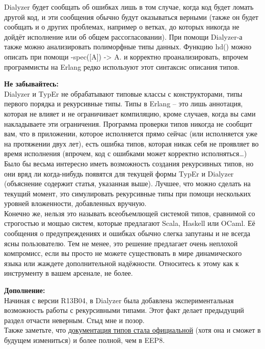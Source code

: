 \documentclass[a4paper,12pt]{report}
\newcommand{\ops}{\colorbox{lgreen}}
\begin{document}
Dialyzer будет сообщать об ошибках лишь в том случае, когда код будет ломать другой код, и эти сообщения обычно будут оказываться верными (также он будет сообщать и о других проблемах, например о ветках, до которых никогда не дойдёт исполнение или об общем рассогласовании). При помощи Dialyzer\--а также можно анализировать полиморфные типы данных. Функцию \ops{hd()} можно описать при помощи \ops{-spec([A]) -> A.} и корректно проанализировать, впрочем программисты на Erlang редко используют этот синтаксис описания типов.\\
\colorbox{lorange}
{
    \begin{minipage}{\linewidth}
        \textbf{Не забывайтесь:}\\
Dialyzer и TypEr не обрабатывают типовые классы с конструкторами, типы первого порядка и рекурсивные типы. Типы в Erlang \--- это лишь аннотация, которая не влияет и не ограничивает компиляцию, кроме случаев, когда вы сами накладываете эти ограничения. Программа проверки типов никогда не сообщит вам, что в приложении, которое исполняется прямо сейчас (или исполняется уже на протяжении двух лет), есть ошибка типов, которая никак себя не проявляет во время исполнения (впрочем, код с ошибками может корректно исполняться\ldots)\\
Было бы весьма интересно иметь возможность создания рекурсивных типов, но они вряд ли когда\--нибудь появятся для текущей формы TypEr и Dialyzer (объяснение содержит статья, указанная выше). Лучшее, что можно сделать на текущий момент, это симулировать рекурсивные типы при помощи нескольких уровней вложенности, добавленных вручную.\\
Конечно же, нельзя это называть всеобъемлющей системой типов, сравнимой со строгостью и мощью систем, которые предлагают Scala, Haskell или OCaml. Её сообщения о предупреждениях и ошибках обычно слегка запутаны и не всегда ясны пользователю. Тем не менее, это решение предлагает очень неплохой компромисс, если вы просто не можете существовать в мире динамического языка или жаждете дополнительной надёжности. Относитесь к этому как к инструменту в вашем арсенале, не более.
    \end{minipage}
}
\colorbox{lgray}
{
    \begin{minipage}{\linewidth}
\textbf{Дополнение:}\\
Начиная с версии R13B04, в Dialyzer была добавлена экспериментальная возможность работы с рекурсивными типами. Этот факт делает предыдущий раздел отчасти неверным. Стыд мне и позор.\\
Также заметьте, что \href{http://erlang.org/doc/reference\_manual/typespec.html}{документация типов стала официальной} (хотя она и сможет в будущем измениться) и более полной, чем в EEP8.
    \end{minipage}
}
\end{document}
